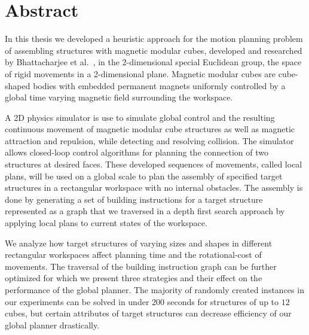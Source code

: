 \chapter*{Abstract}

In this thesis we developed a heuristic approach for the motion planning problem of assembling structures with magnetic modular cubes, developed and researched by Bhattacharjee et al.\ \cite{Bhattacharjee2022}, in the 2-dimensional special Euclidean group, the space of rigid movements in a 2-dimensional plane.
Magnetic modular cubes are cube-shaped bodies with embedded permanent magnets uniformly controlled by a global time varying magnetic field surrounding the workspace.

A 2D physics simulator is use to simulate global control and the resulting continuous movement of magnetic modular cube structures as well as magnetic attraction and repulsion, while detecting and resolving collision.
The simulator allows closed-loop control algorithms for planning the connection of two structures at desired faces.
These developed sequences of movements, called local plans, will be used on a global scale to plan the assembly of specified target structures in a rectangular workspace with no internal obstacles.
The assembly is done by generating a set of building instructions for a target structure represented as a graph that we traversed in a depth first search approach by applying local plans to current states of the workspace.

We analyze how target structures of varying sizes and shapes in different rectangular workspaces affect planning time and the rotational-cost of movements.
The traversal of the building instruction graph can be further optimized for which we present three strategies and their effect on the performance of the global planner.
The majority of randomly created instances in our experiments can be solved in under $200$ seconds for structures of up to $12$ cubes, but certain attributes of target structures can decrease efficiency of our global planner drastically.